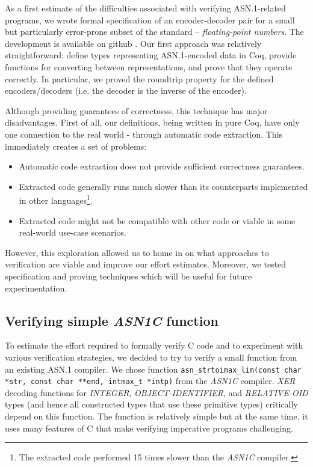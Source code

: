 \documentclass[10p,conference]{IEEEtran}
\begin{document}
As a first estimate of the difficulties associated with verifying
ASN.1-related programs, we wrote formal specification of an
encoder-decoder pair for a small but particularly error-prone subset
of the standard -- \textit{floating-point numbers}. The development is
available on github \cite{asn1fpcoq}. Our first approach was
relatively straightforward: define types representing ASN.1-encoded
data in Coq, provide functions for converting between representations,
and prove that they operate correctly. In particular, we proved the
roundtrip property for the defined encoders/decoders (i.e. the decoder is the inverse of the encoder).

Although providing guarantees of correctness, this technique has major disadvantages.
First of all, our definitions, being written in pure Coq, have only one
connection to the real world - through automatic code extraction.
This immediately creates a set of problems:

\begin{itemize}
\item Automatic code extraction does not provide sufficient correctness guarantees.
\item Extracted code generally runs much slower than its counterparts implemented in other languages\footnote{The extracted code performed 15 times slower than the \emph{ASN1C} compiler.}.
\item Extracted code might not be compatible with other code or viable in some real-world use-case scenarios.
\end{itemize}

However, this exploration allowed us to home in on what approaches
to verification are viable and improve our effort estimates. Moreover, we tested specification and proving techniques which will be useful for future experimentation.

\subsection{Verifying simple  \emph{ASN1C} function}

To estimate the effort required to formally verify C code and to
experiment with various verification strategies, we decided to try to
verify a small function from an existing ASN.1 compiler. We chose
function \texttt{asn\_strtoimax\_lim(const char *str, const char
  **end, intmax\_t *intp)} from the \emph{ASN1C} compiler. \emph{XER}
decoding functions for \emph{INTEGER}, \emph{OBJECT-IDENTIFIER}, and
\emph{RELATIVE-OID} types (and hence all constructed types that use
these primitive types) critically depend on this function. The
function is relatively simple but at the same time, it uses many features
of C that make verifying imperative programs challenging.
\end{document}
